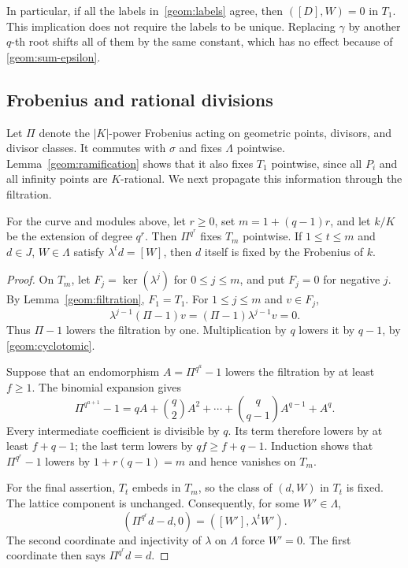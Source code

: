 In particular, if all the labels in~\eqref{geom:labels} agree, then
$([D],W)=0$ in $T_1$.  This implication does not require the labels to
be unique.  Replacing $\gamma$ by another $q$-th root shifts all of them
by the same constant, which has no effect because of
\eqref{geom:sum-epsilon}.

\subsection{Frobenius and rational divisions}

Let $\Pi$ denote the $|K|$-power Frobenius acting on geometric points,
divisors, and divisor classes.  It commutes with $\sigma$ and fixes
$\Lambda$ pointwise.  Lemma~\ref{geom:ramification} shows that it also
fixes $T_1$ pointwise, since all $P_i$ and all infinity points are
$K$-rational.  We next propagate this information through the filtration.

\begin{lemma}
\label{geom:frobenius}
For the curve and modules above, let $r\ge0$, set
$m=1+(q-1)r$, and let $k/K$ be the extension of degree $q^r$.
Then $\Pi^{q^r}$ fixes $T_m$ pointwise.  If $1\le t\le m$ and
$d\in J$, $W\in\Lambda$ satisfy $\lambda^t d=[W]$, then $d$ itself
is fixed by the Frobenius of $k$.
\end{lemma}

\begin{proof}
On $T_m$, let $F_j=\ker(\lambda^j)$ for $0\le j\le m$, and put
$F_j=0$ for negative $j$.  By Lemma~\ref{geom:filtration}, $F_1=T_1$.
For $1\le j\le m$ and $v\in F_j$,
\[
           \lambda^{j-1}(\Pi-1)v
                       =(\Pi-1)\lambda^{j-1}v=0.
\]
Thus $\Pi-1$ lowers the filtration by one.
Multiplication by $q$ lowers it by $q-1$, by
\eqref{geom:cyclotomic}.

Suppose that an endomorphism $A=\Pi^{q^a}-1$ lowers the filtration by
at least $f\ge1$.  The binomial expansion gives
\[
          \Pi^{q^{a+1}}-1
             =qA+\binom q2 A^2+\cdots+
                       \binom q{q-1}A^{q-1}+A^q.
\]
Every intermediate coefficient is divisible by $q$.
Its term therefore lowers by at least $f+q-1$; the last term lowers by
$qf\ge f+q-1$.  Induction shows that $\Pi^{q^r}-1$ lowers by
$1+r(q-1)=m$ and hence vanishes on $T_m$.

For the final assertion, $T_t$ embeds in $T_m$, so the class of $(d,W)$
in $T_t$ is fixed.  The lattice component is unchanged.  Consequently,
for some $W'\in\Lambda$,
\[
             (\Pi^{q^r}d-d,0)=([W'],\lambda^tW').
\]
The second coordinate and injectivity of $\lambda$ on $\Lambda$ force
$W'=0$.  The first coordinate then says $\Pi^{q^r}d=d$.
\end{proof}

